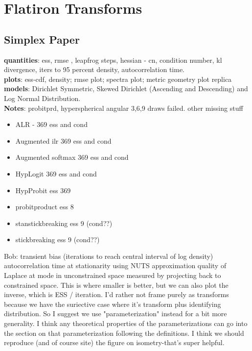\section{Flatiron Transforms}
\label{sec:transforms}
\subsection{Simplex Paper}

\textbf{quantities}: ess, rmse , leapfrog steps, hessian - cn, condition number, kl divergence, iters to 95 percent density, autocorrelation time.\\

\textbf{plots}: ess-cdf, density; rmse plot; spectra plot; metric geometry plot replica\\

\textbf{models}: Dirichlet Symmetric, Skewed Dirichlet (Ascending and Descending) and Log Normal Distribution.\\

\textbf{Notes}: probitprd, hyperspherical angular 3,6,9 draws failed. other missing stuff
\begin{itemize}
\item ALR - 369 ess and cond
\item Augmented ilr 369 ess and cond
\item Augmented softmax 369 ess and cond
\item HypLogit 369 ess and cond
\item HypProbit ess 369

\item probitproduct ess 8
\item stanstickbreaking ess 9 (cond??)
\item stickbreaking ess 9 (cond??)
\end{itemize}


Bob: transient bias (iterations to reach central interval of log density)
autocorrelation time at stationarity using NUTS
approximation quality of Laplace at mode in unconstrained space measured by projecting back to constrained space. This is where smaller is better, but we can also plot the inverse, which is ESS / iteration. I'd rather not frame purely as transforms because we have the suriective case where it's transform plus identifying distribution. So I suggest we use "parameterization" instead for a bit more generality. I think any theoretical properties of the parameterizations can go into the section on that parameterization following the definitions. I think we should reproduce (and of course site) the figure on isometry-that's super helpful.